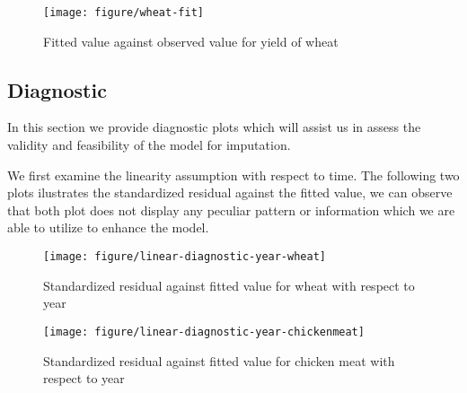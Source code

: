 \documentclass[nojss]{jss}\usepackage[]{graphicx}\usepackage[]{color}
\makeatletter
\def\maxwidth{ %
  \ifdim\Gin@nat@width>\linewidth
    \linewidth
  \else
    \Gin@nat@width
  \fi
}
\newenvironment{knitrout}{}{} %
\makeatother
\begin{document}
\begin{knitrout}
\color{fgcolor}\begin{figure}[]


{\centering \texttt{[image: figure/wheat-fit]} 

}

\caption[Fitted value against observed value for yield of wheat]{Fitted value against observed value for yield of wheat\label{fig:wheat-fit}}
\end{figure}


\end{knitrout}



\subsection{Diagnostic}
In this section we provide diagnostic plots which will assist us in
assess the validity and feasibility of the model for imputation.


We first examine the linearity assumption with respect to time. The
following two plots ilustrates the standardized residual against the
fitted value, we can observe that both plot does not display any
peculiar pattern or information which we are able to utilize to
enhance the model.

\begin{knitrout}
\color{fgcolor}\begin{figure}[]


{\centering \texttt{[image: figure/linear-diagnostic-year-wheat]} 

}

\caption[Standardized residual against fitted value for wheat with respect to year]{Standardized residual against fitted value for wheat with respect to year\label{fig:linear-diagnostic-year-wheat}}
\end{figure}


\end{knitrout}



\begin{knitrout}
\color{fgcolor}\begin{figure}[]


{\centering \texttt{[image: figure/linear-diagnostic-year-chickenmeat]} 

}

\caption[Standardized residual against fitted value for chicken meat with respect to year]{Standardized residual against fitted value for chicken meat with respect to year\label{fig:linear-diagnostic-year-chickenmeat}}
\end{figure}


\end{knitrout}
\end{document}
